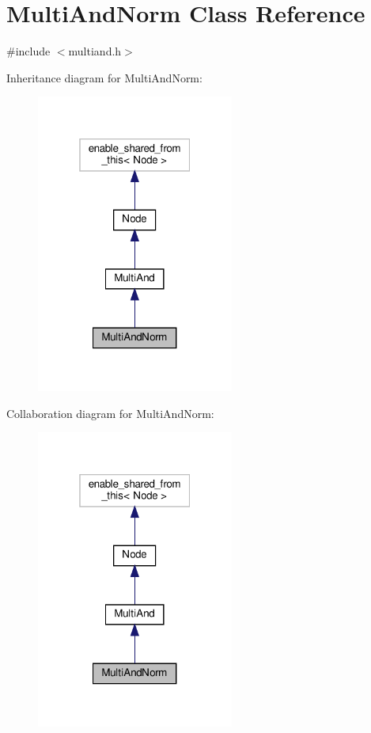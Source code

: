 \hypertarget{class_multi_and_norm}{}\section{Multi\+And\+Norm Class Reference}
\label{class_multi_and_norm}


{\ttfamily \#include $<$multiand.\+h$>$}



Inheritance diagram for Multi\+And\+Norm\+:\nopagebreak
\begin{figure}[H]
\begin{center}
\leavevmode
\includegraphics[width=184pt]{df/d77/class_multi_and_norm__inherit__graph}
\end{center}
\end{figure}


Collaboration diagram for Multi\+And\+Norm\+:\nopagebreak
\begin{figure}[H]
\begin{center}
\leavevmode
\includegraphics[width=184pt]{da/dfa/class_multi_and_norm__coll__graph}
\end{center}
\end{figure}
